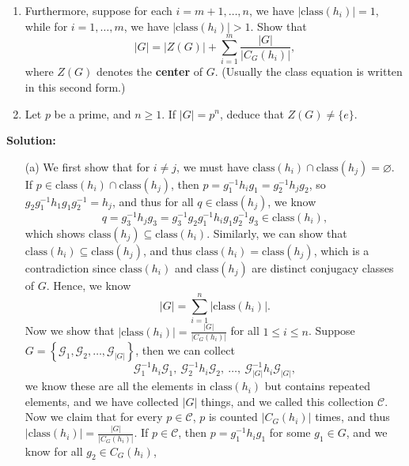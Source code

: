 \documentclass[a4paper,12pt]{article}
\begin{document}
\begin{enumerate}
\begin{enumerate}[label=(\alph*)]
        \item Furthermore, suppose for each $i = m + 1, \dots, n$, we have $|\mathrm{class}(h_i)| = 1$, while for $i = 1, \dots, m$, we have $|\mathrm{class}(h_i)| > 1$. Show that
        \[
            |G| = |Z(G)| + \sum_{i=1}^m \frac{|G|}{|C_G(h_i)|},
        \]
        where $Z(G)$ denotes the \textbf{center} of $G$. (Usually the class equation is written in this second form.)

        \item Let $p$ be a prime, and $n \ge 1$. If $|G| = p^n$, deduce that $Z(G) \ne \{ e \}$.
    \end{enumerate}
    \textbf{Solution:} 
    \begin{itemize}
        \item [(a)] We first show that for \(i \neq j\), we must have \(\mathrm{class}(h_i) \cap \mathrm{class}(h_j) = \varnothing \). If \(p \in \mathrm{class}(h_i) \cap \mathrm{class}(h_j)  \), then \(p = g_1^{-1} h_i g_1 = g_2^{-1} h_j g_2\), so \(g_2 g_1^{-1} h_1 g_1 g_2^{-1} = h_j\), and thus for all \(q \in \mathrm{class}(h_j) \), we know 
        \[
            q = g_3^{-1} h_j g_3 = g_3^{-1} g_2 g_1^{-1} h_i g_1 g_2^{-1} g_3 \in \mathrm{class}(h_i), 
        \] which shows \(\mathrm{class}(h_j) \subseteq \mathrm{class}(h_i)  \). Similarly, we can show that \(\mathrm{class}(h_i) \subseteq \mathrm{class}(h_j)  \), and thus \(\mathrm{class}(h_i) = \mathrm{class}(h_j)  \), which is a contradiction since \(\mathrm{class}(h_i) \) and \(\mathrm{class}(h_j) \) are distinct conjugacy classes of \(G\). Hence, we know 
        \[
            \left\vert G \right\vert = \sum_{i=1}^n \left\vert \mathrm{class}(h_i) \right\vert .  
        \] 
        Now we show that \(\left\vert \mathrm{class}(h_i) \right\vert = \frac{\left\vert G \right\vert }{\left\vert C_G(h_i) \right\vert }\) for all \(1 \le i \le n\). Suppose \(G = \left\{ \mathcal{G} _1, \mathcal{G}_2 , \dots , \mathcal{G}_{\vert G \vert }  \right\} \), then we can collect 
        \[
            \mathcal{G} _1^{-1} h_i \mathcal{G} _1, \  \mathcal{G} _2^{-1} h_i \mathcal{G} _2, \  \dots , \ \mathcal{G} _{\vert G \vert }^{-1} h_i \mathcal{G} _{\vert G \vert }, 
        \] we know these are all the elements in \(\mathrm{class}(h_i) \) but contains repeated elements, and we have collected \(\vert G \vert \) things, and we called this collection \(\mathcal{C} \). Now we claim that for every \(p \in \mathcal{C} \), \(p\) is counted \(\left\vert C_G(h_i) \right\vert \) times, and thus \(\left\vert \mathrm{class}(h_i) \right\vert  = \frac{\vert G \vert }{\vert C_G(h_i) \vert } \). If \(p \in \mathcal{C} \), then \(p = g_1^{-1} h_i g_1\) for some \(g_1 \in G\), and we know for all \(g_2 \in C_G(h_i)\), 

\end{itemize}
\end{enumerate}
\end{document}
